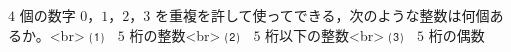 $4$ 個の数字 $0$，$1$，$2$，$3$ を重複を許して使ってできる，次のような整数は何個あるか。<br>
⑴　$5$ 桁の整数<br>
⑵　$5$ 桁以下の整数<br>
⑶　$5$ 桁の偶数
